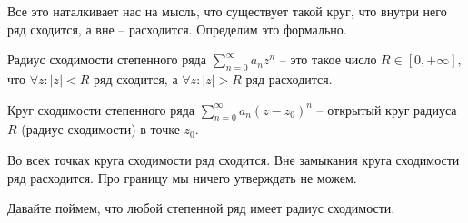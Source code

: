 \vspace*{5mm}

Все это наталкивает нас на мысль, что существует такой круг, что внутри него ряд сходится, а вне -- расходится.
Определим это формально.

\begin{conj}
    Радиус сходимости степенного ряда $\sum\limits_{n=0}^\infty a_n z^n$ -- это такое число $R \in [0, +\infty]$, что $\forall z : |z| < R$ ряд сходится, а $\forall z : |z| > R$ ряд расходится.
\end{conj}

\begin{conj}
    Круг сходимости степенного ряда $\sum\limits_{n=0}^\infty a_n (z - z_0)^n$ -- открытый круг радиуса $R$ (радиус сходимости) в точке $z_0$.
\end{conj}

\begin{center}
\end{center}

\begin{notice}
    Во всех точках круга сходимости ряд сходится. 
    Вне замыкания круга сходимости ряд расходится.
    Про границу мы ничего утверждать не можем. 
\end{notice}

\vspace*{10mm}

Давайте поймем, что любой степенной ряд имеет радиус сходимости.

